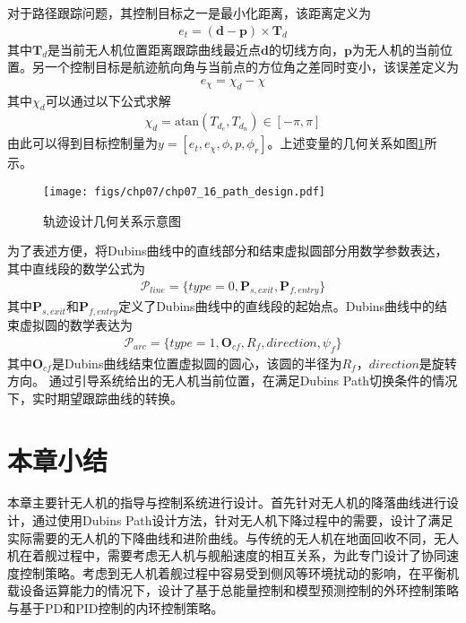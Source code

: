 对于路径跟踪问题，其控制目标之一是最小化距离，该距离定义为
\begin{align}
e_t = (\mathbf{d}-\mathbf{p}) \times \mathbf{T}_d
\end{align}
其中$\mathbf{T}_d$是当前无人机位置距离跟踪曲线最近点$\mathbf{d}$的切线方向，$\mathbf{p}$为无人机的当前位置。另一个控制目标是航迹航向角与当前点的方位角之差同时变小，该误差定义为
\begin{align}
e_{\chi} = \chi_d-\chi
\end{align}
其中$\chi_d$可以通过以下公式求解
\begin{align}
\chi_d = \text{atan} (T_{d_e}, T_{d_n}) \in [-\pi, \pi]
\end{align}
由此可以得到目标控制量为$y=[e_t,e_\chi,\phi,p,\phi_r]$。上述变量的几何关系如图\ref{fig:chp07_16_path_design}所示。

\begin{figure}[ht]   
	\centering
	\texttt{[image: figs/chp07/chp07\_16\_path\_design.pdf]}
	\caption{轨迹设计几何关系示意图}
	\label{fig:chp07_16_path_design}
\end{figure}


为了表述方便，将Dubins曲线中的直线部分和结束虚拟圆部分用数学参数表达，其中直线段的数学公式为
\begin{align}
\mathcal{P}_{line} = \{type=0,\mathbf{P}_{s,exit},\mathbf{P}_{f,entry}\}
\end{align}
其中$\mathbf{P}_{s,exit}$和$\mathbf{P}_{f,entry}$定义了Dubins曲线中的直线段的起始点。Dubins曲线中的结束虚拟圆的数学表达为
\begin{align}
\mathcal{P}_{arc} = \{type=1,\mathbf{O}_{cf},R_f,direction,\psi_f\}
\end{align}
其中$\mathbf{O}_{cf}$是Dubins曲线结束位置虚拟圆的圆心，该圆的半径为$R_f$，$direction$是旋转方向。
通过引导系统给出的无人机当前位置，在满足Dubins Path切换条件的情况下，实时期望跟踪曲线的转换。

\section{本章小结}
本章主要针无人机的指导与控制系统进行设计。首先针对无人机的降落曲线进行设计，通过使用Dubins Path设计方法，针对无人机下降过程中的需要，设计了满足实际需要的无人机的下降曲线和进阶曲线。与传统的无人机在地面回收不同，无人机在着舰过程中，需要考虑无人机与舰船速度的相互关系，为此专门设计了协同速度控制策略。考虑到无人机着舰过程中容易受到侧风等环境扰动的影响，在平衡机载设备运算能力的情况下，设计了基于总能量控制和模型预测控制的外环控制策略与基于PD和PID控制的内环控制策略。

